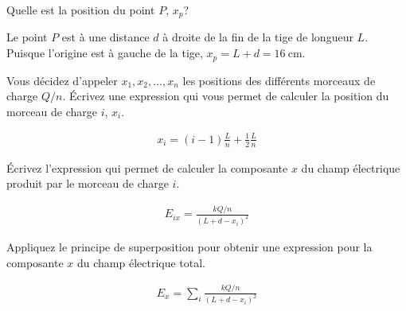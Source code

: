 Quelle est la position du point $P$, $x_p$?

\begin{reponsebox}
  Le point $P$ est à une distance $d$ à droite de la fin de la tige de
  longueur $L$. Puisque l'origine est à gauche de la tige, $x_p = L + d =
  \SI{16}{\centi\meter}$.
\end{reponsebox}

Vous décidez d'appeler $x_1, x_2, \ldots, x_n$ les positions des différents
morceaux de charge $Q/n$. Écrivez une expression qui vous permet de calculer la
position du morceau de charge $i$, $x_i$.

\begin{reponsebox}
  \begin{align*}
    x_{i} = (i - 1) \frac{L}{n} + \frac{1}{2}\frac{L}{n}
  \end{align*}
\end{reponsebox}


Écrivez l'expression qui permet de calculer la composante $x$ du champ
électrique produit par le morceau de charge $i$.

\begin{reponsebox}
  \begin{align*}
    E_{ix} = \frac{k Q/n}{(L + d - x_i)^2}
  \end{align*}
\end{reponsebox}

Appliquez le principe de superposition pour obtenir une expression pour la
composante $x$ du champ électrique total.

\begin{reponsebox}
  \begin{align*}
    E_{x} = \sum_i \frac{k Q/n}{(L + d - x_i)^2}
  \end{align*}
\end{reponsebox}

